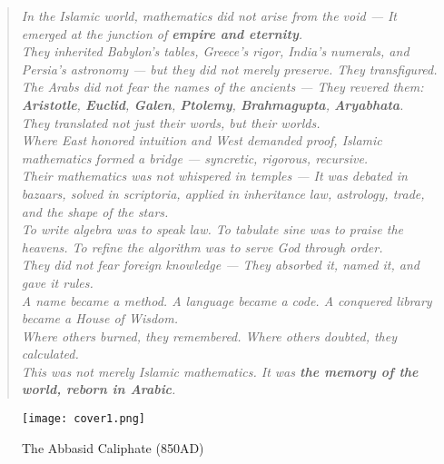 \documentclass[9pt]{article}
\begin{document}
\begin{quote}
\itshape
In the Islamic world, mathematics did not arise from the void ---  
It emerged at the junction of \textbf{empire and eternity}. \\

They inherited Babylon’s tables, Greece’s rigor, India’s numerals, and Persia’s astronomy ---  
but they did not merely preserve. They transfigured. \\

The Arabs did not fear the names of the ancients ---  
They revered them: \textbf{Aristotle}, \textbf{Euclid}, \textbf{Galen}, \textbf{Ptolemy}, \textbf{Brahmagupta}, \textbf{Aryabhata}. \\
They translated not just their words, but their worlds. \\

Where East honored intuition and West demanded proof,  
Islamic mathematics formed a bridge --- \textit{syncretic, rigorous, recursive}. \\

Their mathematics was not whispered in temples ---  
It was debated in bazaars, solved in scriptoria, applied in inheritance law, astrology, trade, and the shape of the stars. \\

To write algebra was to speak law.  
To tabulate sine was to praise the heavens.  
To refine the algorithm was to serve God through order. \\

They did not fear foreign knowledge ---  
They absorbed it, named it, and gave it rules. \\

A name became a method.  
A language became a code.  
A conquered library became a House of Wisdom. \\

Where others burned, they remembered.  
Where others doubted, they \textit{calculated}. \\

This was not merely Islamic mathematics.  
It was \textbf{the memory of the world, reborn in Arabic}.
\end{quote}

\begin{center}
    \begin{figure}[H]
    \centering
    \texttt{[image: cover1.png]}
    \caption{The Abbasid Caliphate (850AD)}
    \end{figure}
\end{center}
\end{document}

